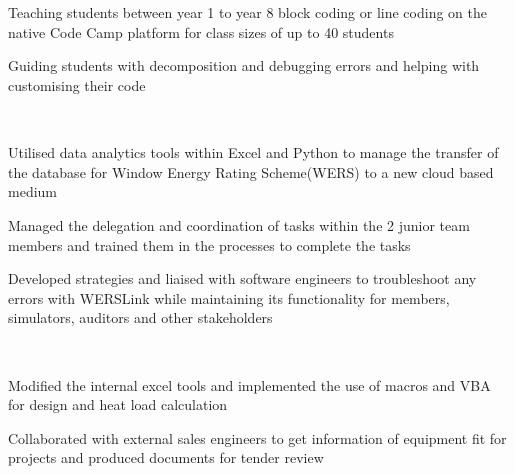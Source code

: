 \documentclass[11pt, a4paper]{TechCV}
\begin{document}
\begin{minipage}[t]{0.58\textwidth} 

\sectionsep \\ %
 \\
\vspace{\topsep} %
\begin{tightemize}
\item Teaching students between year 1 to year 8 block coding or line coding on the native Code Camp platform for class sizes of up to 40 students
\item Guiding students with decomposition and debugging errors and helping with customising their code
\end{tightemize}
\sectionsep

 \\
\vspace{\topsep} %
\begin{tightemize}
\item Utilised data analytics tools within Excel and Python to manage the transfer of the database for Window Energy Rating Scheme(WERS) to a new cloud based medium
\item Managed the delegation and coordination of tasks within the 2 junior team members and trained them in the processes to complete the tasks
\item Developed strategies and liaised with software engineers to troubleshoot any errors with WERSLink while maintaining its functionality for members, simulators, auditors and other stakeholders
\end{tightemize}
\sectionsep

 \\
\vspace{\topsep} %
\begin{tightemize}
\item Modified the internal excel tools and implemented the use of macros and VBA for design and heat load calculation
\item Collaborated with external sales engineers to get information of equipment fit for projects and produced documents for tender review
\end{tightemize}
\sectionsep


\end{minipage}
\end{document}
